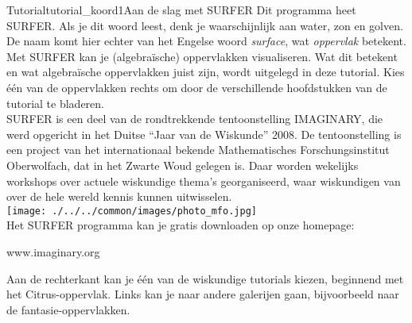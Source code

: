 \begin{surferIntroPage}{Tutorial}{tutorial_koord1}{Aan de slag met SURFER}
Dit programma heet SURFER. Als je dit woord leest, denk je waarschijnlijk aan water, zon en golven. De naam komt hier echter van het Engelse woord {\it surface}, wat {\it oppervlak} betekent.
\\
Met SURFER kan je (algebra\"ische) oppervlakken visualiseren. Wat dit betekent en wat algebra\"ische oppervlakken juist zijn, wordt uitgelegd in deze tutorial. Kies \'e\'en van de oppervlakken rechts om door de verschillende hoofdstukken van de tutorial te bladeren.\\
SURFER is een deel van de rondtrekkende tentoonstelling IMAGINARY, die werd opgericht in het Duitse ``Jaar van de Wiskunde'' 2008. De tentoonstelling is een project van het internationaal bekende Mathematisches Forschungsinstitut Oberwolfach, dat in het Zwarte Woud gelegen is. Daar worden wekelijks workshops over actuele wiskundige thema's georganiseerd, waar wiskundigen van over de hele wereld kennis kunnen uitwisselen. \\
\vspace{0.2cm} \hspace{3.5cm}\texttt{[image: ./../../common/images/photo\_mfo.jpg]}\\
Het SURFER programma kan je gratis downloaden op onze homepage: \\
\begin{centering}
www.imaginary.org\\
\end{centering}
 \vspace{0.2cm}
Aan de rechterkant kan je \'e\'en van de wiskundige tutorials kiezen, beginnend met het Citrus-oppervlak. Links kan je naar andere galerijen gaan, bijvoorbeeld naar de fantasie-oppervlakken.
\end{surferIntroPage}
